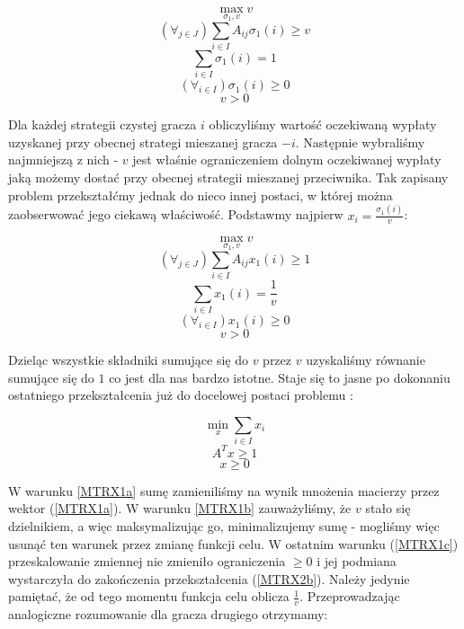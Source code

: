 \documentclass[polish]{standalone}
\begin{document}
$$\max_{\sigma_1,v} v$$
$$(\forall_{j \in J}) \sum_{i \in I} A_{ij} \sigma_1(i) \geq v$$
$$\sum_{i \in I} \sigma_1(i) = 1$$
$$(\forall_{i \in I}) \sigma_1(i) \geq 0$$
$$v > 0$$

Dla każdej strategii czystej gracza $i$ obliczyliśmy wartość oczekiwaną wypłaty uzyskanej przy obecnej strategi
mieszanej gracza $-i$. Następnie wybraliśmy najmniejszą z nich - $v$ jest właśnie ograniczeniem dolnym oczekiwanej
wypłaty jaką możemy dostać przy obecnej strategii mieszanej przeciwnika. Tak zapisany problem przekształćmy jednak do
nieco innej postaci, w której można zaobserwować jego ciekawą właściwość. Podstawmy najpierw $x_i = 
\frac{\sigma_1(i)}{v}$:

$$\max_{\sigma_1,v} v$$
\begin{equation}
(\forall_{j \in J}) \sum_{i \in I} A_{ij} x_1(i) \geq 1 \label{MTRX1a}
\end{equation}
\begin{equation}
\sum_{i \in I} x_1(i) = \frac{1}{v} \label{MTRX1b}
\end{equation}
\begin{equation}
(\forall_{i \in I}) x_1(i) \geq 0 \label{MTRX1c}
\end{equation}
\begin{equation}
v > 0
\end{equation}

Dzieląc wszystkie składniki sumujące się do $v$ przez $v$ uzyskaliśmy równanie sumujące się do $1$ co jest dla nas
bardzo istotne. Staje się to jasne po dokonaniu ostatniego przekształcenia już do docelowej postaci problemu
\cite[str.~63]{O-GT}:

$$\min_x \sum_{i \in I} x_i$$
\begin{equation}
A^Tx \geq 1 \label{MTRX2a}
\end{equation}
\begin{equation}
x \geq 0 \label{MTRX2b}
\end{equation}

W warunku \ref{MTRX1a} sumę zamieniliśmy na wynik mnożenia macierzy przez wektor (\ref{MTRX1a}). W warunku \ref{MTRX1b}
zauważyliśmy, że $v$ stało się dzielnikiem, a więc maksymalizując go, minimalizujemy sumę - mogliśmy więc usunąć ten
warunek przez zmianę funkcji celu. W ostatnim warunku (\ref{MTRX1c}) przeskalowanie zmiennej nie zmieniło ograniczenia
$\geq 0$ i jej podmiana wystarczyła do zakończenia przekształcenia (\ref{MTRX2b}). Należy jedynie pamiętać, że od tego
momentu funkcja celu oblicza $\frac{1}{v}$. Przeprowadzając analogiczne rozumowanie dla gracza drugiego otrzymamy:
\end{document}
